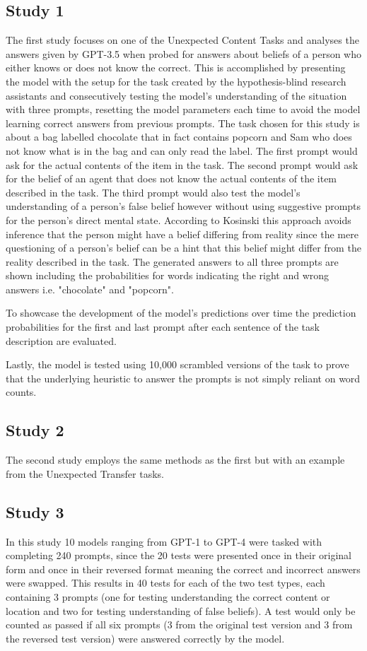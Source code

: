 \subsection{Study 1}
The first study focuses on one of the Unexpected Content Tasks and analyses the answers given by GPT-3.5 when probed for answers about beliefs of a person who either knows or does not know the correct. This is accomplished by presenting the model with the setup for the task created by the hypothesis-blind research assistants and consecutively testing the model's understanding of the situation with three prompts, resetting the model parameters each time to avoid the model learning correct answers from previous prompts. The task chosen for this study is about a bag labelled chocolate that in fact contains popcorn and Sam who does not know what is in the bag and can only read the label. The first prompt would ask for the actual contents of the item in the task. The second prompt would ask for the belief of an agent that does not know the actual contents of the item described in the task. The third prompt would also test the model's understanding of a person's false belief however without using suggestive prompts for the person's direct mental state. According to Kosinski this approach avoids inference that the person might have a belief differing from reality since the mere questioning of a person's belief can be a hint that this belief might differ from the reality described in the task. The generated answers to all three prompts are shown including the probabilities for words indicating the right and wrong answers i.e. "chocolate" and "popcorn".

To showcase the development of the model's predictions over time the prediction probabilities for the first and last prompt after each sentence of the task description are evaluated.

Lastly, the model is tested using 10,000 scrambled versions of the task to prove that the underlying heuristic to answer the prompts is not simply reliant on word counts.

\subsection{Study 2}
The second study employs the same methods as the first but with an example from the Unexpected Transfer tasks.

\subsection{Study 3}
In this study 10 models ranging from GPT-1 to GPT-4 were tasked with completing 240 prompts, since the 20 tests were presented once in their original form and once in their reversed format meaning the correct and incorrect answers were swapped. This results in 40 tests for each of the two test types, each containing 3 prompts (one for testing understanding the correct content or location and two for testing understanding of false beliefs). A test would only be counted as passed if all six prompts (3 from the original test version and 3 from the reversed test version) were answered correctly by the model.